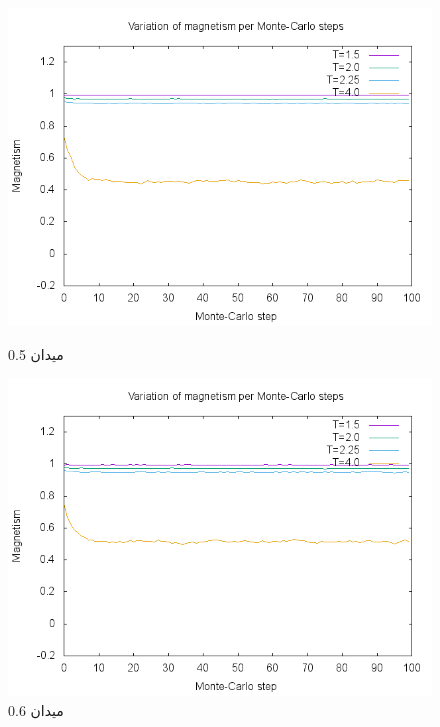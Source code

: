 \documentclass[a4paper,12pt]{article}
\begin{document}
\begin{figure}
\begin{center}
\includegraphics[scale=.8]{H-5.png}\caption{میدان 0.5}
 \includegraphics[scale=.8]{H-6.png}\caption{میدان 0.6}
 \end{center}
\end{figure}
\end{document}
